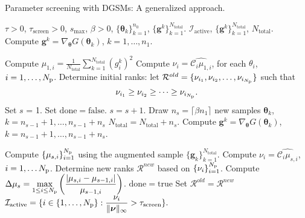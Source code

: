 \bigskip
\begin{breakablealgorithm}
\renewcommand{\algorithmicrequire}{\textbf{Input:}}
\renewcommand{\algorithmicensure}{\textbf{Output:}}
  \caption{Parameter screening with DGSMs: A generalized approach.}
  \begin{algorithmic}[1]
\Require $\tau > 0$, $\tau_\text{screen} > 0$,
$s_\text{max}$, $\beta > 0$, $\{ \bm{\theta}_k \}_{k = 1}^{n_0}$, $\{ \bm{g}^k \}_{k=1}^{N_\text{total}}$. 
\Ensure $\mathcal{I}_\text{active}$, $\{ \bm{g}^k \}_{k=1}^{N_\text{total}}$, $N_\text{total}$. 
      \State Compute $\bm{g}^k = \nabla_{\bm{\theta}}G(\bm\theta_k)$, 
             $k = 1, \ldots, n_1$. 

      \State Compute 
      $\mu_{1, i} = \frac{1}{N_\text{total}} \sum_{k = 1}^{N_\text{total}} (g^k_i)^2$
      \State Compute $\nu_i = \widehat{\mathcal{C}_i\mu_{1,i}}$, for each $\theta_i$, 
             $i = 1, \ldots, {N_\text{p}}$. 
      \State Determine initial ranks: 
            let $\mathcal{R}^{old} = \{ \nu_{i_1}, \nu_{i_2}, \ldots, \nu_{i_{N_\text{p}}}\}$ such that 
\[
   \nu_{i_1} \geq \nu_{i_2} \geq \cdots \geq \nu_{i_{N_\text{p}}}. 
\]
      \State Set $s$ = 1.
      \State Set $\mathrm{done} = \mathrm{false}$.
        \State $s = s + 1$.
        \State Draw $n_s = \lceil \beta n_1 \rceil$ new samples 
                  $\bm{\theta}_k$, $k = n_{s-1} + 1, \ldots, n_{s-1} + n_s$
       \State $N_\text{total} = N_\text{total} + n_s$.
        \State Compute $\bm{g}^k = \nabla_{\bm{\theta}}G(\bm\theta_k)$,
             $k = n_{s-1}+1, \ldots, n_{s-1}+n_s$.

        \State Compute $\{ \mu_{s,i} \}_{i=1}^{N_\text{p}}$ using the augmented sample 
               $\{\bm{g}_k \}_{k = 1}^{N_\text{total}}$.
        \State Compute $\nu_i = \widehat{\mathcal{C}_i\mu_{s,i}}$, $i = 1, \ldots {N_\text{p}}$.
        \State Determine new ranks $\mathcal{R}^{new}$ based on $\{\nu_i\}_{i=1}^{N_\text{p}}$. 
        \State Compute $\displaystyle\Delta\mu_s = \max_{1\leq i \leq {N_\text{p}}}
               \left(\frac{|\mu_{s,i} - \mu_{s-1,i}|}{ \mu_{s-1,i}}\right)$.
         \State $\mathrm{done} = \mathrm{true}$
      \Else
          \State Set $\mathcal{R}^{old} = \mathcal{R}^{new}$
      \EndIf
    \EndWhile
    \State $\mathcal{I}_\text{active} = \{ i \in \{1, \ldots, {N_\text{p}}\} : \displaystyle\frac{\nu_i}
        {\|\bm{\nu}\|_\infty} > \tau_\text{screen}\}.$
    
    \EndProcedure
  \end{algorithmic}
  \label{alg:screen}
\end{breakablealgorithm}
\bigskip

